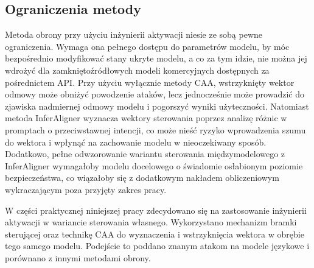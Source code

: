 \subsection{Ograniczenia metody}
Metoda obrony przy użyciu inżynierii aktywacji niesie ze sobą pewne ograniczenia. Wymaga ona pełnego dostępu do parametrów modelu, by móc bezpośrednio modyfikować stany ukryte modelu, a co za tym idzie, nie można jej wdrożyć dla zamkniętoźródłowych modeli komercyjnych dostępnych za pośrednictem API. Przy użyciu wyłącznie metody CAA, wstrzyknięty wektor odmowy może obniżyć powodzenie ataków, lecz jednocześnie może prowadzić do zjawiska nadmiernej odmowy modelu i pogorszyć wyniki użyteczności. Natomiast metoda InferAligner wyznacza wektory sterowania poprzez analizę różnic w promptach o przeciwstawnej intencji, co może nieść ryzyko wprowadzenia szumu do wektora i wpłynąć na zachowanie modelu w nieoczekiwany sposób.
Dodatkowo, pełne odwzorowanie wariantu sterowania międzymodelowego z InferAligner wymagałoby modelu docelowego o świadomie osłabionym poziomie bezpieczeństwa, co wiązałoby się z dodatkowym nakładem obliczeniowym wykraczającym poza przyjęty zakres pracy.

W części praktycznej niniejszej pracy zdecydowano się na zastosowanie inżynierii aktywacji w wariancie sterowania własnego. Wykorzystano mechanizm bramki sterującej oraz technikę CAA do wyznaczenia i wstrzyknięcia wektora w obrębie tego samego modelu. Podejście to poddano znanym atakom na modele językowe i porównano z innymi metodami obrony.
